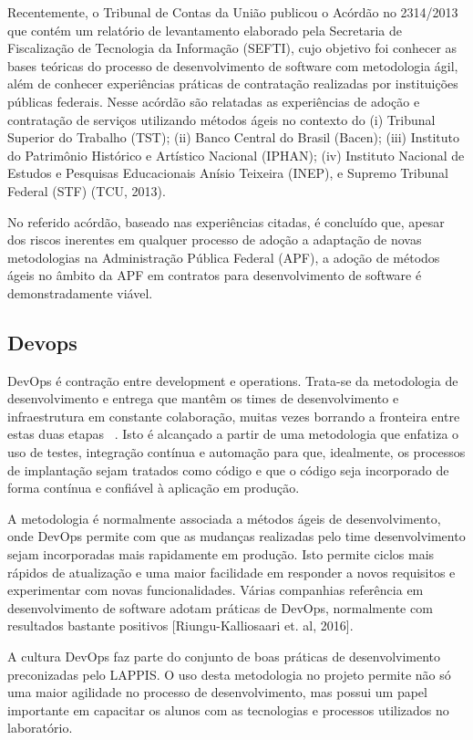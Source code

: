 Recentemente, o Tribunal de Contas da União publicou o Acórdão no 2314/2013 que contém 
um relatório de levantamento elaborado pela Secretaria de
Fiscalização de Tecnologia da Informação (SEFTI), cujo objetivo foi conhecer as
bases teóricas do processo de desenvolvimento de software com metodologia ágil,
além de conhecer experiências práticas de contratação realizadas por
instituições públicas federais. Nesse acórdão são relatadas as experiências de
adoção e contratação de serviços utilizando métodos ágeis no contexto do (i)
Tribunal Superior do Trabalho (TST); (ii) Banco Central do Brasil (Bacen);
(iii) Instituto do Patrimônio Histórico e Artístico Nacional (IPHAN); (iv)
Instituto Nacional de Estudos e Pesquisas Educacionais Anísio Teixeira (INEP),
e Supremo Tribunal Federal (STF) (TCU, 2013).

No referido acórdão, baseado nas experiências citadas, é concluído que, apesar
dos riscos inerentes em qualquer processo de adoção a adaptação de novas
metodologias na Administração Pública Federal (APF), a adoção de métodos ágeis
no âmbito da APF em contratos para desenvolvimento de software é
demonstradamente viável.

\subsection{Devops}
DevOps é contração entre development e operations. Trata-se da metodologia de desenvolvimento e entrega que mantêm os
times de desenvolvimento e infraestrutura em constante colaboração, muitas vezes borrando a fronteira entre estas duas etapas
~\cite{Httermann:2012:DD:2380958}. Isto é alcançado a partir de uma metodologia que enfatiza o uso de testes, integração contínua e automação 
para que, idealmente, os processos de implantação sejam tratados como código e que o código seja incorporado de forma contínua e 
confiável à aplicação em produção. 

A metodologia é normalmente associada a métodos ágeis de desenvolvimento, onde DevOps permite com que as mudanças realizadas 
pelo time desenvolvimento sejam incorporadas mais rapidamente em produção. Isto permite ciclos mais rápidos de atualização e uma 
maior facilidade em responder a novos requisitos e experimentar com novas funcionalidades. Várias companhias referência em desenvolvimento 
de software adotam práticas de DevOps, normalmente com resultados bastante positivos [Riungu-Kalliosaari et. al, 2016].

A cultura DevOps faz parte do conjunto de boas práticas de desenvolvimento preconizadas pelo LAPPIS. O uso desta metodologia no projeto 
permite não só uma maior agilidade no processo de desenvolvimento, mas possui um papel importante em capacitar os alunos com as tecnologias 
e processos utilizados no laboratório.

